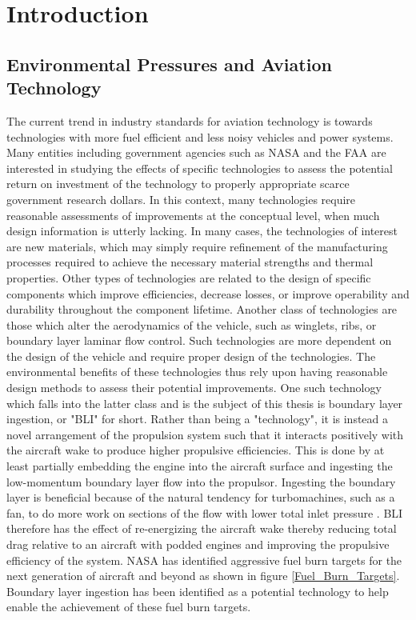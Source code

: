 \chapter{Introduction}

\section{Environmental Pressures and Aviation Technology}
\indent The current trend in industry standards for aviation technology is towards technologies with more fuel efficient and less noisy vehicles and power systems. Many entities including government agencies such as NASA and the FAA are interested in studying the effects of specific technologies to assess the potential return on investment of the technology to properly appropriate scarce government research dollars. In this context, many technologies require reasonable assessments of improvements at the conceptual level, when much design information is utterly lacking.  In many cases, the technologies of interest are new materials, which may simply require refinement of the manufacturing processes required to achieve the necessary material strengths and thermal properties. Other types of technologies are related to the design of specific components which improve efficiencies, decrease losses, or improve operability and durability throughout the component lifetime. Another class of technologies are those which alter the aerodynamics of the vehicle, such as winglets, ribs, or boundary layer laminar flow control. Such technologies are more dependent on the design of the vehicle and require proper design of the technologies. The environmental benefits of these technologies thus rely upon having reasonable design methods to assess their potential improvements.  One such technology which falls into the latter class and is the subject of this thesis is boundary layer ingestion, or "BLI" for short. Rather than being a "technology", it is instead a novel arrangement of the propulsion system such that it interacts positively with the aircraft wake to produce higher propulsive efficiencies. This is done by at least partially embedding the engine into the aircraft surface and ingesting the low-momentum boundary layer flow into the propulsor. Ingesting the boundary layer is beneficial because of the natural tendency for turbomachines, such as a fan, to do more work on sections of the flow with lower total inlet pressure \cite{Smith1993}.  BLI therefore has the effect of re-energizing the aircraft wake thereby reducing total drag relative to an aircraft with podded engines and improving the propulsive efficiency of the system.  NASA has identified aggressive fuel burn targets for the next generation of aircraft and beyond as shown in figure \ref{Fuel_Burn_Targets}.  Boundary layer ingestion has been identified as a potential technology to help enable the achievement of these fuel burn targets.  


